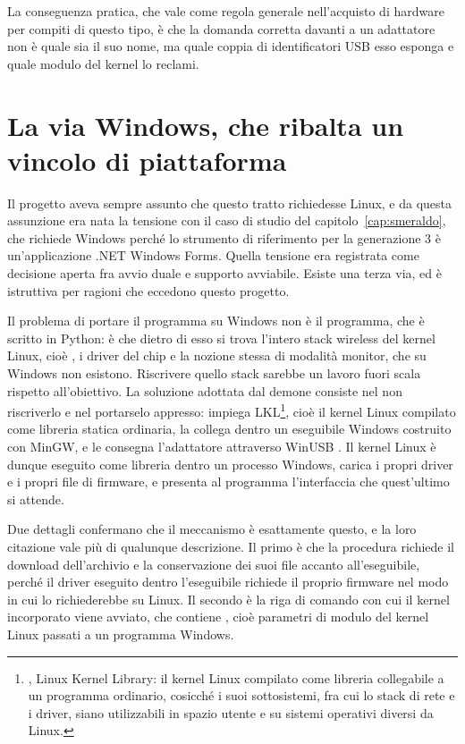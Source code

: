 La conseguenza pratica, che vale come regola generale nell'acquisto di hardware per compiti di questo tipo, è che la domanda corretta davanti a un adattatore non è quale sia il suo nome, ma quale coppia di identificatori USB esso esponga e quale modulo del kernel lo reclami.

\section{La via Windows, che ribalta un vincolo di piattaforma}

Il progetto aveva sempre assunto che questo tratto richiedesse Linux, e da questa assunzione era nata la tensione con il caso di studio del capitolo~\ref{cap:smeraldo}, che richiede Windows perché lo strumento di riferimento per la generazione 3 è un'applicazione .NET Windows Forms. Quella tensione era registrata come decisione aperta fra avvio duale e supporto avviabile. Esiste una terza via, ed è istruttiva per ragioni che eccedono questo progetto.

Il problema di portare il programma su Windows non è il programma, che è scritto in Python: è che dietro di esso si trova l'intero stack wireless del kernel Linux, cioè , i driver del chip e la nozione stessa di modalità monitor, che su Windows non esistono. Riscrivere quello stack sarebbe un lavoro fuori scala rispetto all'obiettivo. La soluzione adottata dal demone  consiste nel non riscriverlo e nel portarselo appresso: impiega LKL\footnote{, Linux Kernel Library: il kernel Linux compilato come libreria collegabile a un programma ordinario, cosicché i suoi sottosistemi, fra cui lo stack di rete e i driver, siano utilizzabili in spazio utente e su sistemi operativi diversi da Linux.}, cioè il kernel Linux compilato come libreria statica ordinaria, la collega dentro un eseguibile Windows costruito con MinGW, e le consegna l'adattatore attraverso WinUSB \cite{ldnd}. Il kernel Linux è dunque eseguito come libreria dentro un processo Windows, carica i propri driver e i propri file di firmware, e presenta al programma l'interfaccia che quest'ultimo si attende.

Due dettagli confermano che il meccanismo è esattamente questo, e la loro citazione vale più di qualunque descrizione. Il primo è che la procedura richiede il download dell'archivio  e la conservazione dei suoi file accanto all'eseguibile, perché il driver eseguito dentro l'eseguibile richiede il proprio firmware nel modo in cui lo richiederebbe su Linux. Il secondo è la riga di comando con cui il kernel incorporato viene avviato, che contiene , cioè parametri di modulo del kernel Linux passati a un programma Windows.

